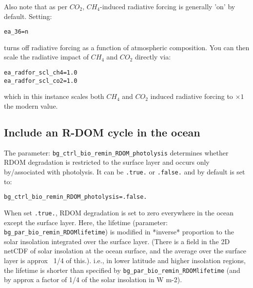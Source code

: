 \vspace{1mm}
Also note that as per \(CO_{2}\), \(CH_{4}\)-induced radiative forcing is generally 'on' by default. Setting:
\small\vspace{-2pt}\begin{verbatim}
ea_36=n
\end{verbatim}\vspace{-2pt}\normalsize
turns off radiative forcing as a function of atmospheric composition. You can then scale the radiative impact of \(CH_{4}\) and \(CO_{2}\) directly via:
\small\vspace{-2pt}\begin{verbatim}
ea_radfor_scl_ch4=1.0
ea_radfor_scl_co2=1.0
\end{verbatim}\vspace{-2pt}\normalsize
which in this instance scales both \(CH_{4}\) and \(CO_{2}\) induced radiative
forcing to \(\times1\) the modern value.

%
\newpage
\subsection*{Include an R-DOM cycle in the ocean}
\vspace{1mm}

The parameter: \texttt{bg\_ctrl\_bio\_remin\_RDOM\_photolysis} determines whether RDOM degradation is restricted to the surface layer and occurs only by/associated with photolysis. It can be \texttt{.true.} or \texttt{.false.} and by default is set to:
\vspace{-2pt}\begin{verbatim}
bg_ctrl_bio_remin_RDOM_photolysis=.false.
\end{verbatim}\vspace{-2pt}
When set \texttt{.true.}, RDOM degradation is set to zero everywhere in the ocean except the surface layer. Here, the lifetime (parameter: \texttt{bg\_par\_bio\_remin\_RDOMlifetime}) is modified in *inverse* proportion to the solar insolation integrated over the surface layer. (There is a field in the 2D netCDF of solar insolation at the ocean surface, and the average over the surface layer is approx ~1/4 of this.). i.e., in lower latitude and higher insolation regions, the lifetime is shorter than specified by \texttt{bg\_par\_bio\_remin\_RDOMlifetime} (and by approx a factor of 1/4 of the solar insolation in W m-2).

%
\newpage
